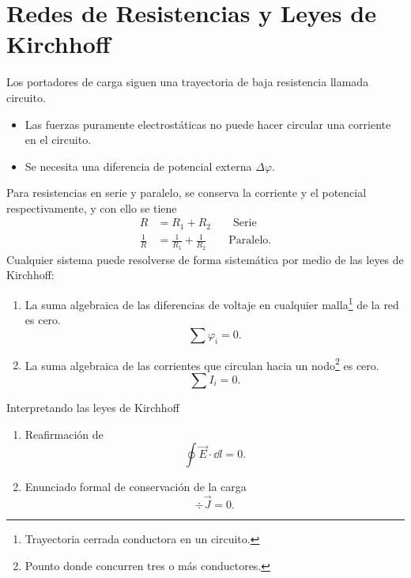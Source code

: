 \section{Redes de Resistencias y Leyes de Kirchhoff}
Los portadores de carga siguen una trayectoria de baja resistencia llamada circuito. 
\begin{itemize}
    \item Las fuerzas puramente electrostáticas no puede hacer circular una corriente en el circuito.
    \item Se necesita una diferencia de potencial externa $\Delta \varphi$.
\end{itemize}
Para resistencias en serie y paralelo, se conserva la corriente y el potencial respectivamente, y con ello se tiene
\begin{align}
    R &= R_1 + R_2 \qquad \text{Serie} \\
    \frac{1}{R} &= \frac{1}{R_1} + \frac{1}{R_2} \qquad \text{Paralelo}.
\end{align}
Cualquier sistema puede resolverse de forma sistemática por medio de las leyes de Kirchhoff:
\begin{enumerate}
    \item La suma algebraica de las diferencias de voltaje en cualquier malla\footnote{Trayectoria cerrada conductora en un circuito.} de la red es cero.
        \begin{equation}
            \sum \varphi _i = 0.
        \end{equation}
    \item La suma algebraica de las corrientes que circulan hacia un nodo\footnote{Pounto donde concurren tres o más conductores.} es cero.
        \begin{equation}
            \sum I_i = 0.
        \end{equation}
\end{enumerate}
Interpretando las leyes de Kirchhoff
\begin{enumerate}
    \item Reafirmación de
        \begin{equation}
            \oint \vec{E} \cdot \dd{l} = 0.
        \end{equation}
    \item Enunciado formal de conservación de la carga
        \begin{equation}
            \div{\vec{J}} = 0.
        \end{equation}
\end{enumerate}


